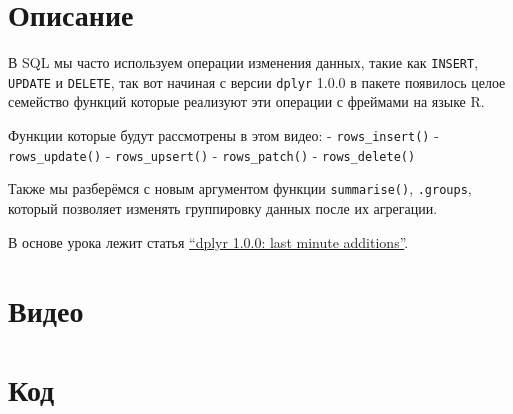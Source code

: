 \documentclass[
]{book}
\begin{document}
\hypertarget{ux43eux43fux438ux441ux430ux43dux438ux435-4}{%
\section{Описание}\label{ux43eux43fux438ux441ux430ux43dux438ux435-4}}

В SQL мы часто используем операции изменения данных, такие как \texttt{INSERT}, \texttt{UPDATE} и \texttt{DELETE}, так вот начиная с версии \texttt{dplyr} 1.0.0 в пакете появилось целое семейство функций которые реализуют эти операции с фреймами на языке R.

Функции которые будут рассмотрены в этом видео:
- \texttt{rows\_insert()}
- \texttt{rows\_update()}
- \texttt{rows\_upsert()}
- \texttt{rows\_patch()}
- \texttt{rows\_delete()}

Также мы разберёмся с новым аргументом функции \texttt{summarise()}, \texttt{.groups}, который позволяет изменять группировку данных после их агрегации.

В основе урока лежит статья \href{https://www.tidyverse.org/blog/2020/05/dplyr-1-0-0-last-minute-additions/}{``dplyr 1.0.0: last minute additions''}.

\hypertarget{ux432ux438ux434ux435ux43e-4}{%
\section{Видео}\label{ux432ux438ux434ux435ux43e-4}}

\hypertarget{ux43aux43eux434-4}{%
\section{Код}\label{ux43aux43eux434-4}}
\end{document}
